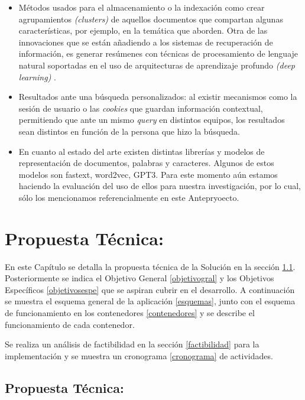 \documentclass[
  10,
  spanish,
  openany]{book}
\begin{document}
\begin{itemize}
\item
  Métodos usados para el almacenamiento o la indexación como crear agrupamientos \emph{(clusters)} de aquellos documentos que compartan algunas características, por ejemplo, en la temática que aborden. Otra de las innovaciones que se están añadiendo a los sistemas de recuperación de información, es generar resúmenes con técnicas de procesamiento de lenguaje natural soportadas en el uso de arquitecturas de aprendizaje profundo \emph{(deep learning)} .
\item
  Resultados ante una búsqueda personalizados: al existir mecanismos como la sesión de usuario o las \emph{cookies} que guardan información contextual, permitiendo que ante un mismo \emph{query} en distintos equipos, los resultados sean distintos en función de la persona que hizo la búsqueda.
\item
  En cuanto al estado del arte existen distintas librerías y modelos de representación de documentos, palabras y caracteres. Algunos de estos modelos son fastext, word2vec, GPT3. Para este momento aún estamos haciendo la evaluación del uso de ellos para nuestra investigación, por lo cual, sólo los mencionamos referencialmente en este Antepryoecto.
\end{itemize}

\hypertarget{propuesta-tuxe9cnica}{%
\chapter{Propuesta Técnica:}\label{propuesta-tuxe9cnica}}

En este Capítulo se detalla la propuesta técnica de la Solución en la sección \ref{propuestatec}. Posteriormente se indica el Objetivo General \ref{objetivogral} y los Objetivos Específicos \ref{objetivosespe} que se aspiran cubrir en el desarrollo. A continuación se muestra el esquema general de la aplicación \ref{esquemas}, junto con el esquema de funcionamiento en los contenedores \ref{contenedores} y se describe el funcionamiento de cada contenedor.

Se realiza un análisis de factibilidad en la sección \ref{factibilidad} para la implementación y se muestra un cronograma \ref{cronograma} de actividades.

\hypertarget{propuestatec}{%
\section{Propuesta Técnica:}\label{propuestatec}}
\end{document}
